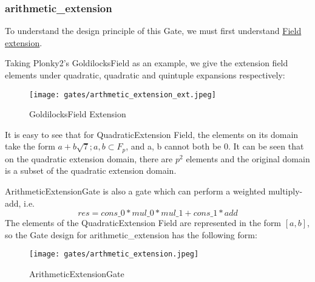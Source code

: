\subsubsection{arithmetic\_extension}

To understand the design principle of this Gate, we must first understand \href{https://en.wikipedia.org/wiki/Field_extension#Extension_field}{Field extension}. 


Taking Plonky2's GoldilocksField as an example, we give the extension field elements under quadratic, quadratic and quintuple expansions respectively:

\begin{figure}[!h]
    \centering
    \texttt{[image: gates/arthmetic\_extension\_ext.jpeg]}
    \caption{GoldilocksField Extension}
    \label{fig:goldilocksfield-extension}
\end{figure}

It is easy to see that for QuadraticExtension Field, the elements on its domain take the form $a + b \sqrt{7}; a,b \subset F_p$, and a, b cannot both be 0.
It can be seen that on the quadratic extension domain, there are $p^2$ elements and the original domain is a subset of the quadratic extension domain.

ArithmeticExtensionGate is also a gate which can perform a weighted multiply-add, i.e.
\[res = cons\_0 * mul\_0 * mul\_1 + cons\_1 * add\]
The elements of the QuadraticExtension Field are represented in the form $[a, b]$, so the Gate design for arithmetic\_extension has the following form:

\begin{figure}[!ht]
    \centering
    \texttt{[image: gates/arthmetic\_extension.jpeg]}
    \caption{ArithmeticExtensionGate}
    \label{fig:arthmetic-extension}
\end{figure}